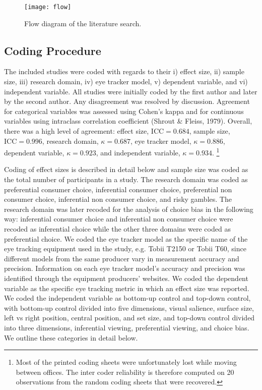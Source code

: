 \documentclass{article}
\begin{document}
\begin{figure}[H]
\texttt{[image: flow]}
\centering
\caption{Flow diagram of the literature search.}
\label{fig:flow_diagram}
\end{figure}


\subsection{Coding Procedure}

The included studies were coded with regards to their i) effect size, ii) sample size, iii) research domain, iv) eye tracker model, v) dependent variable, and vi) independent variable. All studies were initially coded by the first author and later by the second author. Any disagreement was resolved by discussion. Agreement for categorical variables was assessed using Cohen's kappa and for continuous variables using intraclass correlation coefficient (Shrout \& Fleiss, 1979). Overall, there was a high level of agreement: effect size, $\textrm{ICC} = 0.684$, sample size, $\textrm{ICC} = 0.996$, research domain, $\kappa = 0.687$, eye tracker model, $\kappa =0.886$, dependent variable, $\kappa = 0.923$, and independent variable, $\kappa = 0.934$.%
%
\footnote{Most of the printed coding sheets were unfortunately lost while moving between offices. The inter coder reliability is therefore computed on 20 observations from the random coding sheets that were recovered.}

Coding of effect sizes is described in detail below and sample size was coded as the total number of participants in a study. The research domain was coded as preferential consumer choice, inferential consumer choice, preferential non consumer choice, inferential non consumer choice, and risky gambles. The research domain was later recoded for the analysis of choice bias in the following way: inferential consumer choice and inferential non consumer choice were recoded as inferential choice while the other three domains were coded as preferential choice. We coded the eye tracker model as the specific name of the eye tracking equipment used in the study, e.g. Tobii T2150 or Tobii T60, since different models from the same producer vary in measurement accuracy and precision. Information on each eye tracker model's accuracy and precision was identified through the equipment producers' websites. We coded the dependent variable as the specific eye tracking metric in which an effect size was reported. We coded the independent variable as bottom-up control and top-down control, with bottom-up control divided into five dimensions, visual salience, surface size, left vs right position, central position, and set size, and top-down control divided into three dimensions, inferential viewing, preferential viewing, and choice bias. We outline these categories in detail below. 
\end{document}
